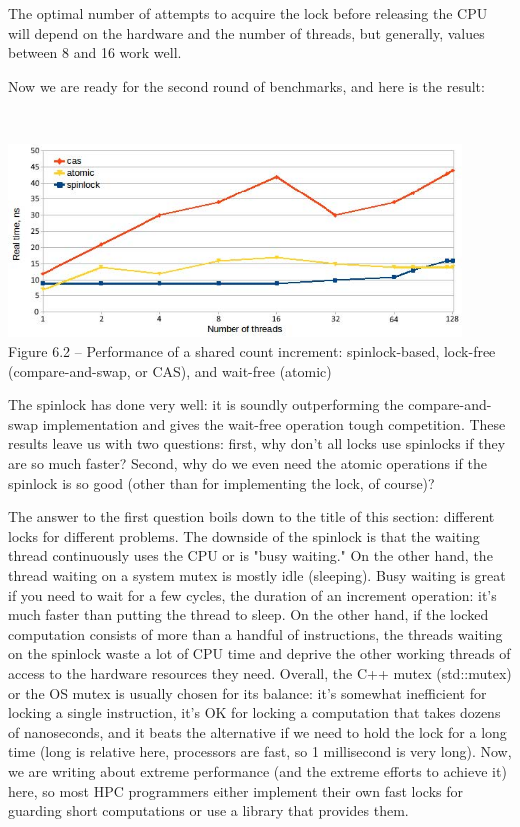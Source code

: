 The optimal number of attempts to acquire the lock before releasing the CPU will depend on the hardware and the number of threads, but generally, values between 8 and 16 work well.

Now we are ready for the second round of benchmarks, and here is the result:

\hspace*{\fill} \\ %
\begin{center}
\includegraphics[width=0.9\textwidth]{content/2/chapter6/images/2.jpg}\\
Figure 6.2 – Performance of a shared count increment: spinlock-based, lock-free (compare-and-swap, or CAS), and wait-free (atomic)
\end{center}

The spinlock has done very well: it is soundly outperforming the compare-and-swap implementation and gives the wait-free operation tough competition. These results leave us with two questions: first, why don't all locks use spinlocks if they are so much faster? Second, why do we even need the atomic operations if the spinlock is so good (other than for implementing the lock, of course)?

The answer to the first question boils down to the title of this section: different locks for different problems. The downside of the spinlock is that the waiting thread continuously uses the CPU or is "busy waiting." On the other hand, the thread waiting on a system mutex is mostly idle (sleeping). Busy waiting is great if you need to wait for a few cycles, the duration of an increment operation: it's much faster than putting the thread to sleep. On the other hand, if the locked computation consists of more than a handful of instructions, the threads waiting on the spinlock waste a lot of CPU time and deprive the other working threads of access to the hardware resources they need. Overall, the C++ mutex (std::mutex) or the OS mutex is usually chosen for its balance: it's somewhat inefficient for locking a single instruction, it's OK for locking a computation that takes dozens of nanoseconds, and it beats the alternative if we need to hold the lock for a long time (long is relative here, processors are fast, so 1 millisecond is very long). Now, we are writing about extreme performance (and the extreme efforts to achieve it) here, so most HPC programmers either implement their own fast locks for guarding short computations or use a library that provides them. 

